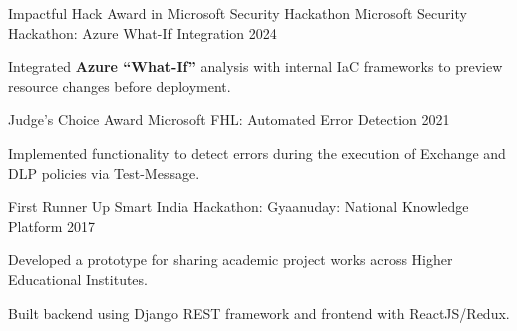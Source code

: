 
\begin{cventries}

    \cventry
    {Impactful Hack Award in Microsoft Security Hackathon}
    {Microsoft Security Hackathon: Azure What-If Integration} %
    {} %
    {2024} %
    {
        \begin{cvitems}
            \item {Integrated \textbf{Azure ``What-If''} analysis with internal IaC frameworks to preview resource changes before deployment.}
        \end{cvitems}
    }
    \cventry
    {Judge's Choice Award} %
    {Microsoft FHL: Automated Error Detection} %
    {} %
    {2021} %
    {
        \begin{cvitems}
            \item{Implemented functionality to detect errors during the execution of Exchange and DLP policies via Test-Message.}
        \end{cvitems}
    }
    \cventry
    {First Runner Up} %
    {Smart India Hackathon: Gyaanuday: National Knowledge Platform} %
    {} %
    {2017} %
    {
      \begin{cvitems} %
        \item {Developed a prototype for sharing academic project works across Higher Educational Institutes.}
        \item {Built backend using Django REST framework and frontend with ReactJS/Redux.}
      \end{cvitems}
    }
\end{cventries}
